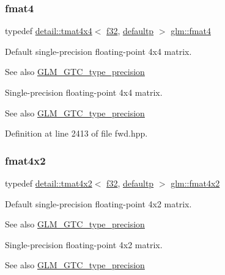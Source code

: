 \subsubsection{\texorpdfstring{fmat4}{fmat4}}
{\footnotesize\ttfamily typedef \hyperlink{structglm_1_1detail_1_1tmat4x4}{detail\+::tmat4x4}$<$ \hyperlink{group__gtc__type__precision_ga0ec999b57f5330d9021256e96038df04}{f32}, \hyperlink{namespaceglm_a0f04f086094c747d227af4425893f545a9d21ccd8b5a009ec7eb7677befc3bf51}{defaultp} $>$ \hyperlink{group__gtc__type__precision_gafbea1649c5384f13ff4595c9d0003a68}{glm\+::fmat4}}

Default single-\/precision floating-\/point 4x4 matrix. \begin{DoxySeeAlso}{See also}
\hyperlink{group__gtc__type__precision}{G\+L\+M\+\_\+\+G\+T\+C\+\_\+type\+\_\+precision}
\end{DoxySeeAlso}
Single-\/precision floating-\/point 4x4 matrix. \begin{DoxySeeAlso}{See also}
\hyperlink{group__gtc__type__precision}{G\+L\+M\+\_\+\+G\+T\+C\+\_\+type\+\_\+precision} 
\end{DoxySeeAlso}


Definition at line 2413 of file fwd.\+hpp.

\mbox{\label{group__gtc__type__precision_ga0cf4b66f4929b3c21ab7b967386fc7dd}} 
\subsubsection{\texorpdfstring{fmat4x2}{fmat4x2}}
{\footnotesize\ttfamily typedef \hyperlink{structglm_1_1detail_1_1tmat4x2}{detail\+::tmat4x2}$<$ \hyperlink{group__gtc__type__precision_ga0ec999b57f5330d9021256e96038df04}{f32}, \hyperlink{namespaceglm_a0f04f086094c747d227af4425893f545a9d21ccd8b5a009ec7eb7677befc3bf51}{defaultp} $>$ \hyperlink{group__gtc__type__precision_ga0cf4b66f4929b3c21ab7b967386fc7dd}{glm\+::fmat4x2}}

Default single-\/precision floating-\/point 4x2 matrix. \begin{DoxySeeAlso}{See also}
\hyperlink{group__gtc__type__precision}{G\+L\+M\+\_\+\+G\+T\+C\+\_\+type\+\_\+precision}
\end{DoxySeeAlso}
Single-\/precision floating-\/point 4x2 matrix. \begin{DoxySeeAlso}{See also}
\hyperlink{group__gtc__type__precision}{G\+L\+M\+\_\+\+G\+T\+C\+\_\+type\+\_\+precision} 
\end{DoxySeeAlso}


